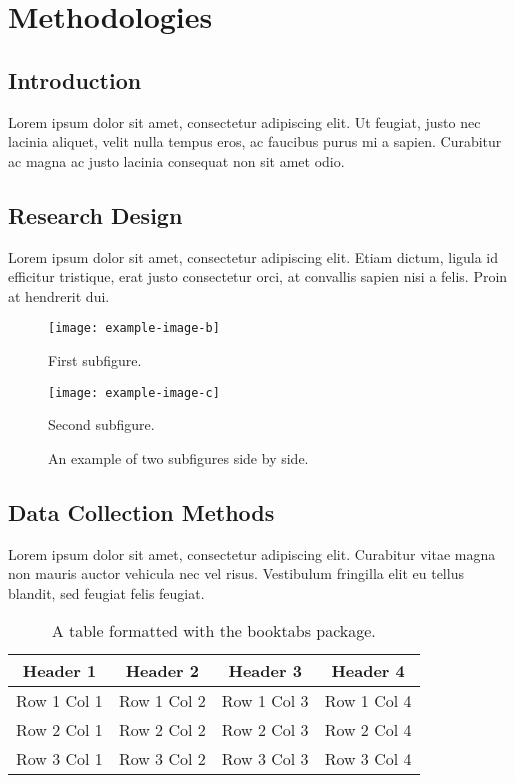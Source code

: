 \chapter{Methodologies}
\section{Introduction}
Lorem ipsum dolor sit amet, consectetur adipiscing elit. Ut feugiat, justo nec lacinia aliquet, velit nulla tempus eros, ac faucibus purus mi a sapien. Curabitur ac magna ac justo lacinia consequat non sit amet odio.

\section{Research Design}
Lorem ipsum dolor sit amet, consectetur adipiscing elit. Etiam dictum, ligula id efficitur tristique, erat justo consectetur orci, at convallis sapien nisi a felis. Proin at hendrerit dui.
\begin{figure}[ht]
        \texttt{[image: example-image-b]}
        \caption{First subfigure.}
        \label{fig:sub1}
\end{figure}
\begin{figure}
        \texttt{[image: example-image-c]}
        \caption{Second subfigure.}
        \label{fig:sub2}
    \caption{An example of two subfigures side by side.}
    \label{fig:sidebyside}
\end{figure}
\section{Data Collection Methods}
Lorem ipsum dolor sit amet, \cite{wikipedia2023artificial}consectetur adipiscing elit. Curabitur vitae magna non mauris auctor vehicula nec vel risus. Vestibulum fringilla elit eu tellus blandit, sed feugiat felis feugiat.
\begin{table}[ht]
    \centering
    \begin{tabular}{cccc}
        \toprule
        Header 1 & Header 2 & Header 3 & Header 4 \\
        \midrule
        Row 1 Col 1 & Row 1 Col 2 & Row 1 Col 3 & Row 1 Col 4 \\
        Row 2 Col 1 & Row 2 Col 2 & Row 2 Col 3 & Row 2 Col 4 \\
        Row 3 Col 1 & Row 3 Col 2 & Row 3 Col 3 & Row 3 Col 4 \\
        \bottomrule
    \end{tabular}
    \caption{A table formatted with the booktabs package.}
    \label{tab:booktabs}
\end{table}
